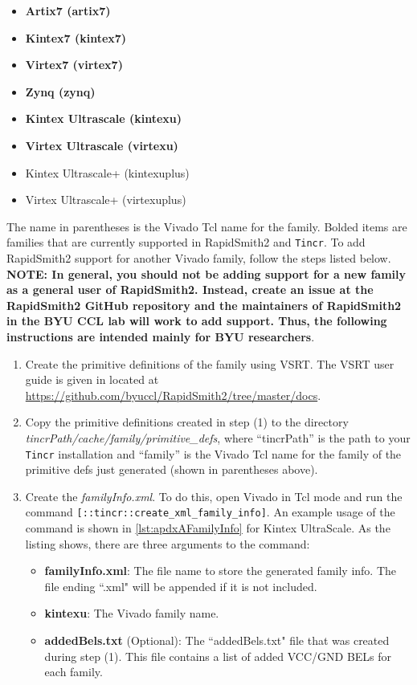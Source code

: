 \begin{multicols}{2}
	\begin {itemize}
	  \item \textbf{Artix7 (artix7)}
	  \item \textbf{Kintex7 (kintex7)}
	  \item \textbf{Virtex7 (virtex7)}
	  \item \textbf{Zynq (zynq)}
	  \item \textbf{Kintex Ultrascale (kintexu)}
	  \item \textbf{Virtex Ultrascale (virtexu)}
	  \item Kintex Ultrascale+ (kintexuplus)
	  \item Virtex Ultrascale+ (virtexuplus)
	\end{itemize}
\end{multicols}

\noindent The name in parentheses is the Vivado Tcl name for the family. Bolded
items are families that are currently supported in RapidSmith2 and
\texttt{Tincr}. To add RapidSmith2 support for another Vivado family, follow the
steps listed below. \textbf{NOTE: In general, you should not be adding support
for a new family as a general user of RapidSmith2. Instead, create an issue at the
RapidSmith2 GitHub repository and the maintainers of RapidSmith2 in the BYU CCL
lab will work to add support. Thus, the following instructions are intended
mainly for BYU researchers}.

\begin {enumerate}
  \item Create the primitive definitions of the family using VSRT. The VSRT user
  guide is given in located at {\color{blue}\url{
  https://github.com/byuccl/RapidSmith2/tree/master/docs}}.
  
  \item Copy the primitive definitions created in step (1) to the
   directory \textit{tincrPath/cache/family/primitive\_defs}, where
   ``tincrPath'' is the path to your \texttt{Tincr} installation and ``family''
   is the Vivado Tcl name for the family of the primitive defs just generated
   (shown in parentheses above).
   
   \item Create the \textit{familyInfo.xml}. To do this, open Vivado in Tcl mode
   and run the command \texttt{[::tin\-cr::create\-\_xml\_family\_info]}. An
   example usage of the command is shown in \autoref{lst:apdxAFamilyInfo} for
   Kintex UltraScale. As the listing shows, there are three arguments to the
   command:
   
	\begin{itemize}
	  \item \textbf{familyInfo.xml}: The file name to store the generated family
	  info. The file ending ``.xml" will be appended if it is not included.
	  \item \textbf{kintexu}: The Vivado family name.
	  \item \textbf{addedBels.txt} (Optional): The ``addedBels.txt" file that was
	  created during step (1). This file contains a list of added VCC/GND BELs for
	  each family.
	\end{itemize}    
\end{enumerate}

